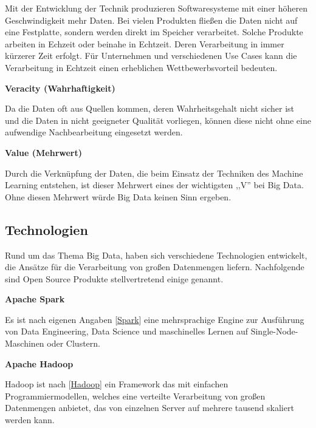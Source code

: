 Mit der Entwicklung der Technik produzieren Softwaresysteme mit einer höheren Geschwindigkeit mehr Daten. Bei vielen Produkten fließen die Daten nicht auf eine Festplatte, sondern werden direkt im Speicher verarbeitet. Solche Produkte arbeiten in Echzeit oder beinahe in Echtzeit. Deren Verarbeitung in immer kürzerer Zeit erfolgt. Für Unternehmen und verschiedenen Use Cases kann die Verarbeitung in Echtzeit einen erheblichen Wettbewerbsvorteil bedeuten.\vspace{0.5cm}

\textbf{Veracity (Wahrhaftigkeit)}\vspace{0.2cm}

Da die Daten oft aus Quellen kommen, deren Wahrheitsgehalt nicht sicher ist und die Daten in nicht geeigneter Qualität vorliegen, können diese nicht ohne eine aufwendige Nachbearbeitung eingesetzt werden.\vspace{0.5cm}

\textbf{Value (Mehrwert)}\vspace{0.2cm}

Durch die Verknüpfung der Daten, die beim Einsatz der Techniken des Machine Learning entstehen, ist dieser Mehrwert eines der wichtigsten ,,V'' bei Big Data. Ohne diesen Mehrwert würde Big Data keinen Sinn ergeben.

\subsection{Technologien}
Rund um das Thema Big Data, haben sich verschiedene Technologien entwickelt, die Ansätze für die Verarbeitung von großen Datenmengen liefern. Nachfolgende sind Open Source Produkte stellvertretend einige genannt.\vspace{0.2cm}

\textbf{Apache Spark}\vspace{0.2cm}

Es ist nach eigenen Angaben [\href{https://spark.apache.org}{Spark}] eine mehrsprachige Engine zur Ausführung von Data Engineering, Data Science und maschinelles Lernen auf Single-Node-Maschinen oder Clustern.\vspace{0.5cm}

\textbf{Apache Hadoop}\vspace{0.2cm}

Hadoop ist nach [\href{https://hadoop.apache.org}{Hadoop}] ein Framework das mit einfachen Programmiermodellen, welches eine verteilte Verarbeitung von großen Datenmengen anbietet, das von einzelnen Server auf mehrere tausend skaliert werden kann.\vspace{0.5cm}

